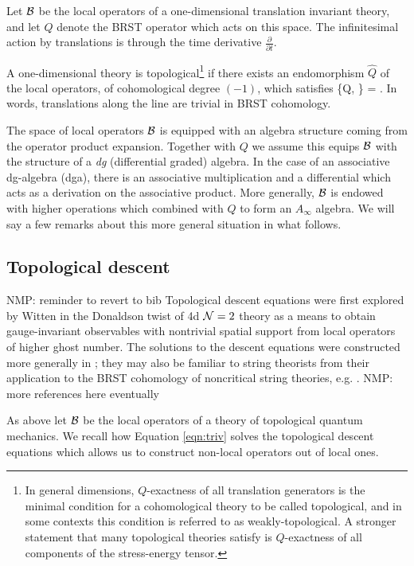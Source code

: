 \documentclass[11pt]{amsart}
\def\natalie#1{{\textcolor{green!65!black}{NMP: {#1}}}}
\begin{document}
Let $\mathcal B$ be the local operators of a one-dimensional translation invariant theory, and let $Q$ denote the BRST operator which acts on this space. 
The infinitesimal action by translations is through the time derivative $\frac{\partial}{\partial t}$. 

A one-dimensional theory is topological\footnote{In general dimensions, $Q$-exactness of all translation generators is the minimal condition for a cohomological theory to be called topological, and in some contexts this condition is referred to as weakly-topological. A stronger statement that many topological theories satisfy is $Q$-exactness of all components of the stress-energy tensor.} if there exists an endomorphism $\hat{Q}$ of the local operators, of cohomological degree $(-1)$, which satisfies
\beqn\label{eqn:triv}
\{Q, \} =  .
\eeqn
In words, translations along the line are trivial in BRST cohomology. 

The space of local operators $\mathcal B$ is equipped with an algebra structure coming from the operator product expansion. 
Together with $Q$ we assume this equips $\mathcal B$ with the structure of a {\em dg} (differential graded) algebra. In the case of an associative dg-algebra (dga), there is an associative multiplication and a differential which acts as a derivation on the associative product. 
More generally, $\mathcal B$ is endowed with higher operations which combined with $Q$ to form an $A_\infty$ algebra. 
We will say a few remarks about this more general situation in what follows. 

\subsection{Topological descent} 
\natalie{reminder to revert to bib}
Topological descent equations were first explored by Witten in the Donaldson twist of 4d $\mathcal N=2$ theory \cite{W88} as a means to obtain gauge-invariant observables with nontrivial spatial support from local operators of higher ghost number. The solutions to the descent equations were constructed more generally in \cite{MW97}; they may also be familiar to string theorists from their application to the BRST cohomology of noncritical string theories, e.g. \cite{WZ92}. \natalie{more references here eventually}

As above let $\mathcal B$ be the local operators of a theory of topological quantum mechanics. 
We recall how Equation \eqref{eqn:triv} solves the topological descent equations which allows us to construct non-local operators out of local ones. 
\end{document}
